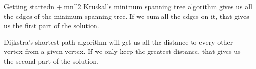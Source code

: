 \documentclass{writeup}
\begin{document}
\begin{solutions}
  \begin{solution}{Getting started}{n + m}{n^2}
    Kruskal's minimum spanning tree algorithm gives us all the edges of the minimum spanning tree.
    If we sum all the edges on it, that gives us the first part of the solution.


    Dijkstra's shortest path algorithm will get us all the distance to every other vertex from a given vertex.
    If we only keep the greatest distance, that gives us the second part of the solution.
  \end{solution}
\end{solutions}
\end{document}
